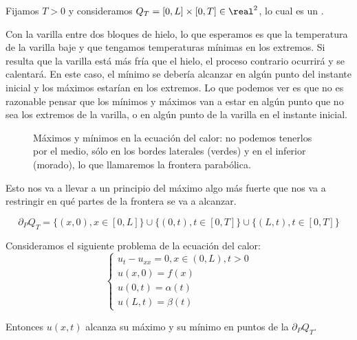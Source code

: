 	 Fijamos $T > 0$ y consideramos $Q_T = [0,L]\times [0,T] \in \real^2$, lo cual es un .

	 Con la varilla entre dos bloques de hielo, lo que esperamos es que la temperatura de la varilla baje y que tengamos temperaturas mínimas en los extremos. Si resulta que la varilla está más fría que el hielo, el proceso contrario ocurrirá y se calentará. En este caso, el mínimo se debería alcanzar en algún punto del instante inicial y los máximos estarían en los extremos. Lo que podemos ver es que no es razonable pensar que los mínimos y máximos van a estar en algún punto que no sea los extremos de la varilla, o en algún punto de la varilla en el instante inicial.

	 \begin{figure}[hbtp]
	 \centering
	 \caption{Máximos y mínimos en la ecuación del calor: no podemos tenerlos por el medio, sólo en los bordes laterales (verdes) y en el inferior (morado), lo que llamaremos la frontera parabólica.}
	 \label{fig:EcCalorMaximosMinimos}
	 \end{figure}

	 Esto nos va a llevar a un principio del máximo algo más fuerte que nos va a restringir en qué partes de la frontera se va a alcanzar.

	 \begin{defn} \label{def:FronteraParabolica}
		\[\partial_P Q_T = \{(x,0), x \in [0,L]\} \cup \{(0,t), t \in [0,T]\} \cup \{(L,t), t \in [0,T]\}\]
	 \end{defn}

	 \begin{theorem} \label{thm:MaximoDebilCalor} Consideramos el siguiente problema de la ecuación del calor:
		\[ \begin{cases}
			u_{t} - u_{xx} = 0, x \in (0,L), t > 0 \\
			u(x,0) = f(x) \\
			u(0,t) = \alpha(t) \\
			u(L,t) = \beta(t)
		\end{cases}\]

		Entonces $u(x,t)$ alcanza su máximo y su mínimo en puntos de la  $\partial_P Q_T$.
	 \end{theorem}


